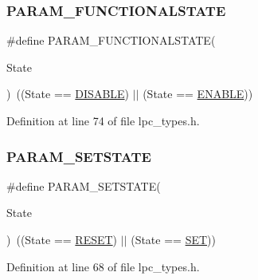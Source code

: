 \subsubsection{\texorpdfstring{P\+A\+R\+A\+M\+\_\+\+F\+U\+N\+C\+T\+I\+O\+N\+A\+L\+S\+T\+A\+TE}{PARAM\_FUNCTIONALSTATE}}
{\footnotesize\ttfamily \#define P\+A\+R\+A\+M\+\_\+\+F\+U\+N\+C\+T\+I\+O\+N\+A\+L\+S\+T\+A\+TE(\begin{DoxyParamCaption}\item[{}]{State }\end{DoxyParamCaption})~((State == \hyperlink{group___l_p_c___types___public___types_ggac9a7e9a35d2513ec15c3b537aaa4fba1ad3a9df141be0ccf10389b640f492b26d}{D\+I\+S\+A\+B\+LE}) $\vert$$\vert$ (State == \hyperlink{group___l_p_c___types___public___types_ggac9a7e9a35d2513ec15c3b537aaa4fba1a7d46875fa3ebd2c34d2756950eda83bf}{E\+N\+A\+B\+LE}))}



Definition at line 74 of file lpc\+\_\+types.\+h.

\mbox{\label{group___l_p_c___types___public___types_gafb6827323e4c501477936a84bd733b4f}} 
\subsubsection{\texorpdfstring{P\+A\+R\+A\+M\+\_\+\+S\+E\+T\+S\+T\+A\+TE}{PARAM\_SETSTATE}}
{\footnotesize\ttfamily \#define P\+A\+R\+A\+M\+\_\+\+S\+E\+T\+S\+T\+A\+TE(\begin{DoxyParamCaption}\item[{}]{State }\end{DoxyParamCaption})~((State == \hyperlink{group___l_p_c___types___public___types_gga89136caac2e14c55151f527ac02daaffa589b7d94a3d91d145720e2fed0eb3a05}{R\+E\+S\+ET}) $\vert$$\vert$ (State == \hyperlink{group___l_p_c___types___public___types_gga89136caac2e14c55151f527ac02daaffab44c8101cc294c074709ec1b14211792}{S\+ET}))}



Definition at line 68 of file lpc\+\_\+types.\+h.

\mbox{\label{group___l_p_c___types___public___types_gaa8cecfc5c5c054d2875c03e77b7be15d}} 
